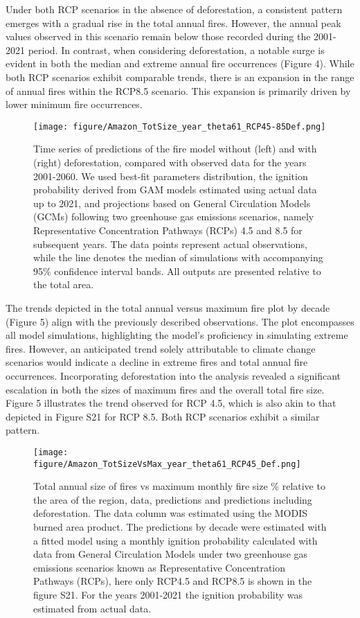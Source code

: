 \documentclass[
]{article}
\begin{document}
Under both RCP scenarios in the absence of deforestation, a consistent
pattern emerges with a gradual rise in the total annual fires. However,
the annual peak values observed in this scenario remain below those
recorded during the 2001-2021 period. In contrast, when considering
deforestation, a notable surge is evident in both the median and extreme
annual fire occurrences (Figure 4). While both RCP scenarios exhibit
comparable trends, there is an expansion in the range of annual fires
within the RCP8.5 scenario. This expansion is primarily driven by lower
minimum fire occurrences.

\begin{figure}
\centering
\texttt{[image: figure/Amazon\_TotSize\_year\_theta61\_RCP45-85Def.png]}
\caption{Time series of predictions of the fire model without (left) and
with (right) deforestation, compared with observed data for the years
2001-2060. We used best-fit parameters distribution, the ignition
probability derived from GAM models estimated using actual data up to
2021, and projections based on General Circulation Models (GCMs)
following two greenhouse gas emissions scenarios, namely Representative
Concentration Pathways (RCPs) 4.5 and 8.5 for subsequent years. The data
points represent actual observations, while the line denotes the median
of simulations with accompanying 95\% confidence interval bands. All
outputs are presented relative to the total area.}
\end{figure}

The trends depicted in the total annual versus maximum fire plot by
decade (Figure 5) align with the previously described observations. The
plot encompasses all model simulations, highlighting the model's
proficiency in simulating extreme fires. However, an anticipated trend
solely attributable to climate change scenarios would indicate a decline
in extreme fires and total annual fire occurrences. Incorporating
deforestation into the analysis revealed a significant escalation in
both the sizes of maximum fires and the overall total fire size. Figure
5 illustrates the trend observed for RCP 4.5, which is also akin to that
depicted in Figure S21 for RCP 8.5. Both RCP scenarios exhibit a similar
pattern.

\begin{figure}
\centering
\texttt{[image: figure/Amazon\_TotSizeVsMax\_year\_theta61\_RCP45\_Def.png]}
\caption{Total annual size of fires vs maximum monthly fire size \%
relative to the area of the region, data, predictions and predictions
including deforestation. The data column was estimated using the MODIS
burned area product. The predictions by decade were estimated with a
fitted model using a monthly ignition probability calculated with data
from General Circulation Models under two greenhouse gas emissions
scenarios known as Representative Concentration Pathways (RCPs), here
only RCP4.5 and RCP8.5 is shown in the figure S21. For the years
2001-2021 the ignition probability was estimated from actual data.}
\end{figure}
\end{document}
